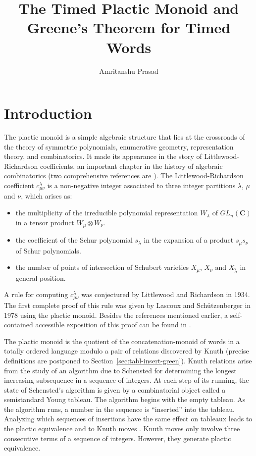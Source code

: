 \documentclass[10pt]{amsproc}
\title[Timed Plactic Monoid and Greene's theorem]{The Timed Plactic Monoid and\\Greene's Theorem for Timed Words}
\author{Amritanshu Prasad}
\theoremstyle{definition}
\theoremstyle{remark}
\begin{document}
\maketitle
\section{Introduction}
\label{sec:intro}
The plactic monoid is a simple algebraic structure that lies at the crossroads of the theory of symmetric polynomials, enumerative geometry, representation theory, and combinatorics.
It made its appearance in the story of Littlewood-Richardson coefficients, an important chapter in the history of algebraic combinatorics (two comprehensive references are \cite{fulton,manivel}).
The Littlewood-Richardson coefficient $c^\lambda_{\mu\nu}$ is a non-negative integer associated to three integer partitions $\lambda$, $\mu$ and $\nu$, which arises as:
\begin{itemize}
\item the multiplicity of the irreducible polynomial representation $W_\lambda$ of $GL_n(\mathbf C)$ in a tensor product $W_\mu\otimes W_\nu$.
\item the coefficient of the Schur polynomial $s_\lambda$ in the expansion of a product $s_\mu s_\nu$ of Schur polynomials.
\item the number of points  of intersection of Schubert varieties $X_\mu$, $X_\nu$ and $X_{\check\lambda}$ in general position.
\end{itemize}
A rule for computing $c^\lambda_{\mu\nu}$ was conjectured by Littlewood and Richardson in 1934.
The first complete proof of this rule was given by Lascoux and Sch\"utzenberger \cite{plaxique} in 1978 using the plactic monoid.
Besides the references mentioned earlier, a self-contained accessible exposition of this proof can be found in \cite{schur_poly}.

The plactic monoid is the quotient of the concatenation-monoid of words in a totally ordered language modulo a pair of relations discovered by Knuth (precise definitions are postponed to Section~\ref{sec:tabl-insert-green}).
Knuth relations arise from the study of an algorithm due to Schensted \cite{schensted} for determining the longest increasing subsequence in a sequence of integers.
At each step of its running, the state of Schensted's algorithm is given by a combinatorial object called a semistandard Young tableau.
The algorithm begins with the empty tableau.
As the algorithm runs, a number in the sequence is ``inserted'' into the tableau.
Analyzing which sequences of insertions have the same effect on tableaux leads to the plactic equivalence and to Knuth moves \cite[Section~6]{knuth}.
Knuth moves only involve three consecutive terms of a sequence of integers.
However, they generate plactic equivalence.
\end{document}
